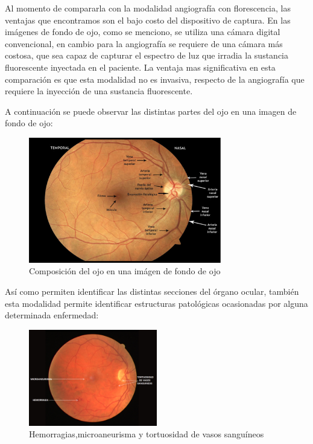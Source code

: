 Al momento de compararla con la modalidad angiograf\'ia con florescencia, las ventajas que encontramos son el bajo costo del dispositivo de captura. En las im\'agenes de fondo de ojo, como se menciono, se utiliza una c\'amara digital convencional, en cambio para la angiograf\'ia se requiere de una c\'amara m\'as costosa, que sea capaz de capturar el espectro de luz que irradia la sustancia fluorescente inyectada en el paciente. La ventaja mas significativa en esta comparaci\'on es que esta modalidad no es invasiva, respecto de la angiograf\'ia que requiere la inyecci\'on de una sustancia fluorescente.

A continuaci\'on se puede observar las distintas partes del ojo en una imagen de fondo de ojo:
\begin{figure}[H]
	{
	\centering
	\includegraphics[width=0.75\textwidth]{Figures/ComposicionOjoIFO}
	\caption[Glaucoma]{Composici\'on del ojo en una im\'agen de fondo de ojo}
	\label{fig:Composici\'on del ojo, observada en una im\'agen de fondo de ojo}
	}
\end{figure}

As\'i como permiten identificar las distintas secciones del \'organo ocular, tambi\'en esta modalidad permite identificar estructuras patol\'ogicas ocasionadas por alguna determinada enfermedad:
\begin{figure}[H]
	{
	\centering
	\includegraphics[width=0.5\textwidth]{Figures/HMT}
	\caption[HMT]{Hemorragias,microaneurisma y tortuosidad de vasos sangu\'ineos}
	\label{fig:Hemorragias,microaneurisma y tortuosidad de vasos sangu\'ineos}
	}
\end{figure}

